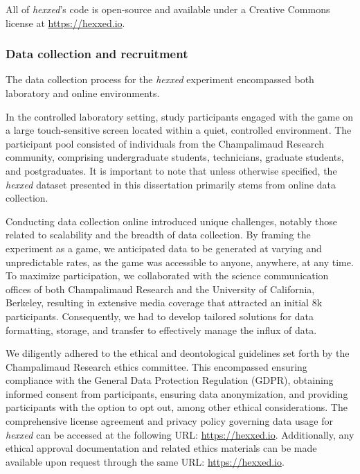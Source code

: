 \documentclass[11pt]{article}
\begin{document}
All of \textit{hexxed}'s code is open-source and available under a Creative Commons license at \url{https://hexxed.io}.

\subsubsection{Data collection and recruitment}

The data collection process for the \textit{hexxed} experiment encompassed both laboratory and online environments.

In the controlled laboratory setting, study participants engaged with the game on a large touch-sensitive screen located within a quiet, controlled environment. The participant pool consisted of individuals from the Champalimaud Research community, comprising undergraduate students, technicians, graduate students, and postgraduates. It is important to note that unless otherwise specified, the \textit{hexxed} dataset presented in this dissertation primarily stems from online data collection.

Conducting data collection online introduced unique challenges, notably those related to scalability and the breadth of data collection. By framing the experiment as a game, we anticipated data to be generated at varying and unpredictable rates, as the game was accessible to anyone, anywhere, at any time. To maximize participation, we collaborated with the science communication offices of both Champalimaud Research and the University of California, Berkeley, resulting in extensive media coverage that attracted an initial 8k participants. Consequently, we had to develop tailored solutions for data formatting, storage, and transfer to effectively manage the influx of data.

We diligently adhered to the ethical and deontological guidelines set forth by the Champalimaud Research ethics committee. This encompassed ensuring compliance with the General Data Protection Regulation (GDPR), obtaining informed consent from participants, ensuring data anonymization, and providing participants with the option to opt out, among other ethical considerations. The comprehensive license agreement and privacy policy governing data usage for \textit{hexxed} can be accessed at the following URL: \url{https://hexxed.io}. Additionally, any ethical approval documentation and related ethics materials can be made available upon request through the same URL: \url{https://hexxed.io}.
\end{document}
